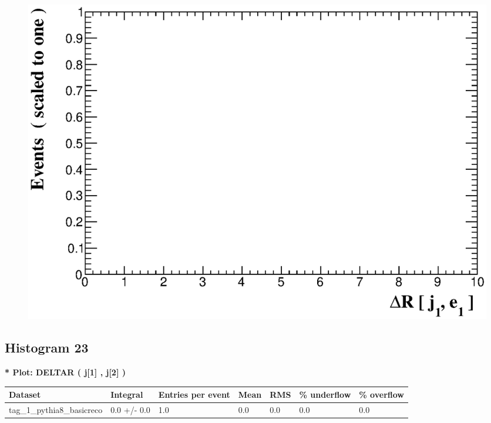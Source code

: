 \documentclass[a4paper, 10pt]{article}
\begin{document}
\begin{figure}[H]
  \begin{center}
    \includegraphics[scale=0.45]{selection_21.eps}\\
\caption{   }
  \end{center}
\end{figure}
      \newpage
\subsection{ Histogram 23}

\textbf{* Plot: DELTAR ( j[1] , j[2] ) }\\
   \begin{table}[H]
  \begin{center}
    \begin{tabular}{|m{23.0mm}|m{23.0mm}|m{18.0mm}|m{19.0mm}|m{19.0mm}|m{19.0mm}|m{19.0mm}|}
      \hline
      {\cellcolor{yellow}         Dataset}& {\cellcolor{yellow}         Integral}& {\cellcolor{yellow}         Entries per event}& {\cellcolor{yellow}         Mean}& {\cellcolor{yellow}         RMS}& {\cellcolor{yellow}         \% underflow}& {\cellcolor{yellow}         \% overflow}\\
      \hline
      {\cellcolor{white}         tag\_1\_pythia8\_basicreco}& {\cellcolor{white}         0.0 +/\-- 0.0}& {\cellcolor{white}         1.0}& {\cellcolor{white}         0.0}& {\cellcolor{white}         0.0}& {\cellcolor{green}         0.0}& {\cellcolor{green}         0.0}\\
\hline
    \end{tabular}
  \end{center}
\end{table}
\end{document}

